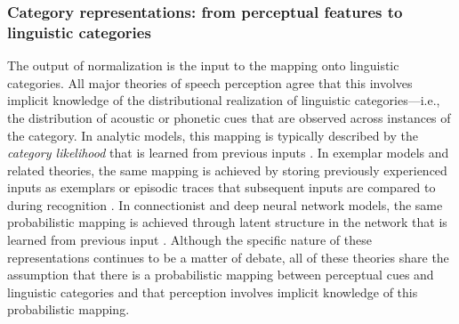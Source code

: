 \documentclass[
  11pt,
  man,floatsintext]{apa6}
\begin{document}
\subsubsection{Category representations: from perceptual features to linguistic categories}\label{sec:representations}

The output of normalization is the input to the mapping onto linguistic categories. All major theories of speech perception agree that this involves implicit knowledge of the distributional realization of linguistic categories---i.e., the distribution of acoustic or phonetic cues that are observed across instances of the category. In analytic models, this mapping is typically described by the \emph{category likelihood} that is learned from previous inputs \autocites[e.g., in the neighborhood activation model,][]{luce-pisoni1998}[shortlist B,][]{norris-mcqueen2008}[and other Bayesian inference models,][]{clayards2008,feldman2009,kleinschmidt-jaeger2015}. In exemplar models and related theories, the same mapping is achieved by storing previously experienced inputs as exemplars \autocites[e.g.,][]{johnson2006,pierrehumbert2001,wedel2006} or episodic traces \autocite{goldinger1996} that subsequent inputs are compared to during recognition \autocite[e.g., by means of \(k\)-nearest neighbor algorithms,][]{fix-hodges1989}. In connectionist and deep neural network models, the same probabilistic mapping is achieved through latent structure in the network that is learned from previous input \autocite{mcclelland-elman1986,magnuson2020}. Although the specific nature of these representations continues to be a matter of debate, all of these theories share the assumption that there is a probabilistic mapping between perceptual cues and linguistic categories \autocite[see also][ on the close computational relation between exemplar and Bayesian inference models]{shi2010} and that perception involves implicit knowledge of this probabilistic mapping.
\end{document}
